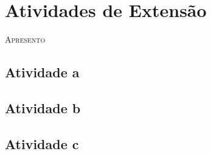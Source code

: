 \chapter{Atividades de Extensão}




\lettrine[lines=2, lhang=0.33, loversize=0.25, findent=1.5em]{A}{presento} 
\lipsum[50]


\section{Atividade a}
\lipsum[49]

\lipsum[50]

\lipsum[51]

\section{Atividade b}
\lipsum[52]

\lipsum[53]

\lipsum[54]

\section{Atividade c}

\lipsum[55]

\lipsum[56]

\lipsum[57]